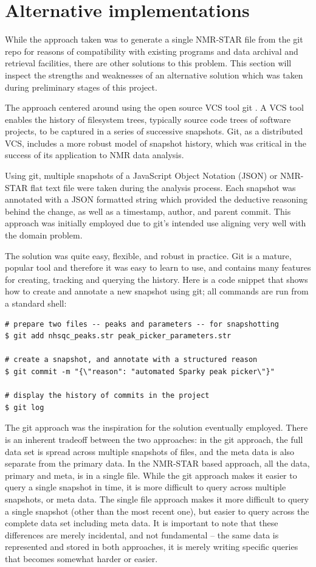 \section{Alternative implementations}

While the approach taken was to generate a single NMR-STAR file from the git
repo for reasons of compatibility with existing programs and data archival
and retrieval facilities, there are other solutions to this problem.  This
section will inspect the strengths and weaknesses of an alternative solution
which was taken during preliminary stages of this project.

The approach centered around using the open source VCS tool git 
\cite{loeliger2012git}.  A VCS tool enables the history of filesystem trees,
typically source code trees of software projects, to be captured in a series
of successive snapshots.  Git, as a distributed VCS, includes a more robust
model of snapshot history, which was critical in the success of its 
application to NMR data analysis.

Using git, multiple snapshots of a JavaScript Object Notation (JSON) or 
NMR-STAR flat text file were
taken during the analysis process.  Each snapshot was annotated with a 
JSON formatted string which provided the deductive reasoning behind the change,
as well as a timestamp, author, and parent commit.  This approach was initially
employed due to git's intended use aligning very well with the domain problem.

The solution was quite easy, flexible, and robust in practice.  Git is a mature,
popular tool and therefore it was easy to learn to use, and contains many
features for creating, tracking and querying the history.  Here is a code 
snippet that shows how to create and annotate a new snapshot using git; all
commands are run from a standard shell:
\begin{verbatim}
# prepare two files -- peaks and parameters -- for snapshotting
$ git add nhsqc_peaks.str peak_picker_parameters.str

# create a snapshot, and annotate with a structured reason
$ git commit -m "{\"reason": "automated Sparky peak picker\"}"

# display the history of commits in the project
$ git log
\end{verbatim}

The git approach was the inspiration for the solution eventually employed.
There is an inherent tradeoff between the two approaches: in the git approach,
the full data set is spread across multiple snapshots of files, and the meta
data is also separate from the primary data.  In the NMR-STAR based approach,
all the data, primary and meta, is in a single file.  While the git approach
makes it easier to query a single snapshot in time, it is more difficult to
query across multiple snapshots, or meta data.  The single file approach makes
it more difficult to query a single snapshot (other than the most recent one),
but easier to query across the complete data set including meta data.  It is
important to note that these differences are merely incidental, and not 
fundamental -- the same data is represented and stored in both approaches, it
is merely writing specific queries that becomes somewhat harder or easier.


